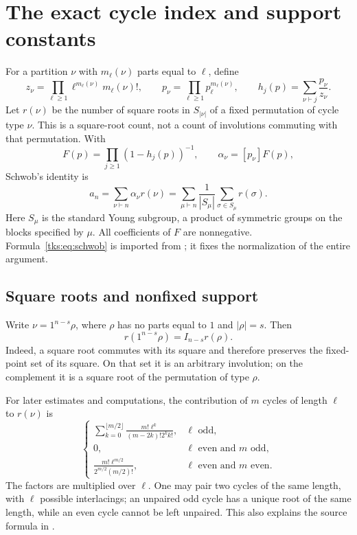 \section{The exact cycle index and support constants}\label{tks:sec:identity}
For a partition $\nu$ with $m_\ell(\nu)$ parts equal to $\ell$, define
\[
z_\nu=\prod_{\ell\geq1}\ell^{m_\ell(\nu)}m_\ell(\nu)!,\qquad
p_\nu=\prod_{\ell\geq1}p_\ell^{m_\ell(\nu)},\qquad
h_j(p)=\sum_{\nu\vdash j}\frac{p_\nu}{z_\nu}.
\]
Let $r(\nu)$ be the number of square roots in $S_{|\nu|}$ of a fixed permutation of cycle type $\nu$. This is a square-root count, not a count of involutions commuting with that permutation. With
\begin{equation}\label{tks:eq:F}
F(p)=\prod_{j\geq1}(1-h_j(p))^{-1},\qquad
\alpha_\nu=[p_\nu]F(p),
\end{equation}
Schwob's identity is
\begin{equation}\label{tks:eq:schwob}
a_n=\sum_{\nu\vdash n}\alpha_\nu r(\nu)
 =\sum_{\mu\vdash n}\frac1{|S_\mu|}\sum_{\sigma\in S_\mu}r(\sigma).
\end{equation}
Here $S_\mu$ is the standard Young subgroup, a product of symmetric groups on the blocks specified by $\mu$. All coefficients of $F$ are nonnegative. Formula~\eqref{tks:eq:schwob} is imported from \cite[\S4.3]{Schwob}; it fixes the normalization of the entire argument.

\subsection{Square roots and nonfixed support}
Write $\nu=1^{n-s}\rho$, where $\rho$ has no parts equal to $1$ and $|\rho|=s$. Then
\begin{equation}\label{tks:eq:rootfactor}
r(1^{n-s}\rho)=I_{n-s}r(\rho).
\end{equation}
Indeed, a square root commutes with its square and therefore preserves the fixed-point set of its square. On that set it is an arbitrary involution; on the complement it is a square root of the permutation of type $\rho$.

For later estimates and computations, the contribution of $m$ cycles of length $\ell$ to $r(\nu)$ is
\begin{equation}\label{tks:eq:rootcycles}
\begin{cases}
\displaystyle\sum_{k=0}^{\lfloor m/2\rfloor}
 \frac{m!\ell^k}{(m-2k)!2^kk!},&\ell\text{ odd},\\[7pt]
0,&\ell\text{ even and }m\text{ odd},\\[3pt]
\displaystyle\frac{m!\ell^{m/2}}{2^{m/2}(m/2)!},
 &\ell\text{ even and }m\text{ even}.
\end{cases}
\end{equation}
The factors are multiplied over $\ell$. One may pair two cycles of the same length, with $\ell$ possible interlacings; an unpaired odd cycle has a unique root of the same length, while an even cycle cannot be left unpaired. This also explains the source formula in \cite[\S3.1]{Schwob}.

